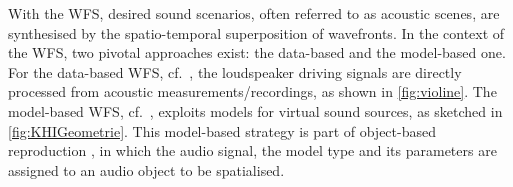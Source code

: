 With the WFS, desired sound scenarios, often referred to as acoustic scenes,
are synthesised by the spatio-temporal superposition of wavefronts.
%
In the context of the WFS, two pivotal approaches exist: the data-based and the
model-based one.
%
For the data-based WFS, cf.~\cite{Berkhout1988_JAES}, the loudspeaker driving
signals are directly processed from acoustic measurements/recordings,
as shown in \myfig\ref{fig:violine}.
%
The model-based WFS, cf.~\cite{Berkhout1993_JASA}, exploits models
for virtual sound sources, as sketched in \myfig\ref{fig:KHIGeometrie}.
%
This model-based strategy is part of object-based reproduction
\cite{Vaananen2002, Plogsties2003,Plogsties2003, Brandenburg2004,
Geier2008,Spors2013_IEEE,Sporer2018_book},
in which the audio signal, the model type and its parameters are assigned
to an audio object to be spatialised.



